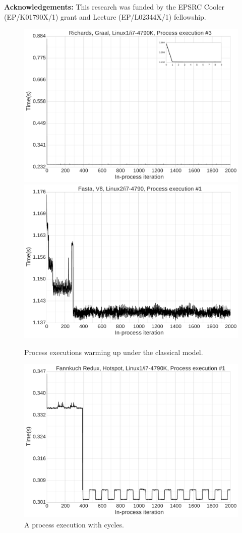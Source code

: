 \documentclass[preprint]{sigplanconf}
\begin{document}
\textbf{Acknowledgements:} This research was funded by the EPSRC Cooler
(EP/K01790X/1) grant and Lecture (EP/L02344X/1) fellowship.





\begin{figure}
\includegraphics[width=.5\textwidth]{examples_v2_results/good_fast.pdf}
\includegraphics[width=.5\textwidth]{examples_v2_results/good_tiers.pdf}
\caption{Process executions warming up under the classical model.}
\label{fig:good1}
\end{figure}


\begin{figure}
\includegraphics[width=.5\textwidth]{examples_v2_results/bad_cycles.pdf}
\caption{A process execution with cycles.}
\label{fig:cycles}
\end{figure}
\end{document}
